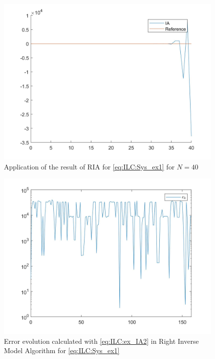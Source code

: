 \begin{exam}
	\begin{figure}[ht!]
		\centering
		\includegraphics[width=\textwidth]{fig/IA_N40_output.jpg}
		\caption{Application of the result of RIA for \ref{eq:ILC:Sys_ex1} for $N = 40$}
		\label{fig:ILC:IA_N_output40}
	\end{figure}
	
	
	\begin{figure}[ht!]
		\centering
		\includegraphics[width=\textwidth]{fig/IA_N40_errorEv2.jpg}
		\caption{Error evolution calculated with \eqref{eq:ILC:ex_IA2} in Right Inverse Model Algorithm for \ref{eq:ILC:Sys_ex1}}
			\label{fig:ILC:A}
	\end{figure}
	
\end{exam}


